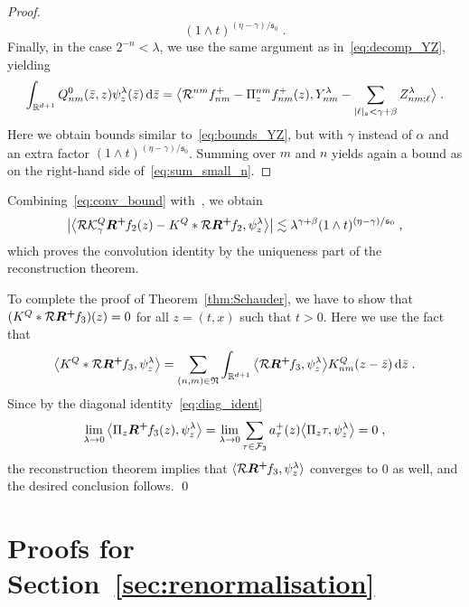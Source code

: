 \documentclass[reqno,11pt]{article}
\def\Rplus{\boldsymbol{R^+}\hspace{-.1em}}
\def\fraks{\mathfrak{s}}
\def\abss#1{\abs{#1}_\mathfrak{s}}
\newcommand{\setnm}{\mathfrak{N}}
\newcommand{\sumnm}{\sum_{(n,m)\in\setnm}}
\begin{document}
\begin{proof}
\begin{equation}
(1\wedge t)^{(\eta-\gamma)/\fraks_0}\;.
\end{equation} 
Finally, in the case $2^{-n} < \lambda$, we use the same argument as
in~\eqref{eq:decomp_YZ}, yielding 
\begin{equation}
 \int_{\R^{d+1}} Q^0_{nm}(\bar z,z) \psi^\lambda_z(\bar z)\6\bar z 
 = \bigpscal{\cR^{nm}f^+_{nm} - \Pi^{nm}_z f^+_{nm}(z)}
 {Y^\lambda_{nm} - \sum_{\abss{\ell} < \gamma+\beta} Z^\lambda_{nm;\ell}}\;.
\end{equation} 
Here we obtain bounds similar to~\eqref{eq:bounds_YZ}, but with $\gamma$
instead of $\alpha$ and an extra factor $(1\wedge t)^{(\eta-\gamma)/\fraks_0}$.
Summing over $m$ and $n$ yields again a bound as on the right-hand side
of~\eqref{eq:sum_small_n}. 
\end{proof}

Combining~\eqref{eq:conv_bound} with~\cite[Lem.~6.7]{Hairer2014}, we obtain
\begin{equation}
  \bigabs{\bigpscal{\cR\cK^Q_\gamma\Rplus f_2(z) - K^Q*\cR \Rplus f_2}
 {\psi^\lambda_z}} \lesssim \lambda^{\gamma+\beta} (1\wedge
t)^{(\eta-\gamma)/\fraks_0}\;,
\end{equation} 
which proves the convolution identity by the uniqueness part of the
reconstruction theorem. 

To complete the proof of Theorem~\ref{thm:Schauder}, we have to show that
$(K^Q*\cR\Rplus f_3)(z) = 0$ for all $z=(t,x)$ such that $t>0$. Here we use
the fact that 
\begin{equation}
 \bigpscal{K^Q*\cR \Rplus f_3}{\psi^\lambda_z}
 = \sumnm \int_{\R^{d+1}} \bigpscal{\cR\Rplus f_3}{\psi^\lambda_z}
 K^Q_{nm}(z-\bar z)\6\bar z\;.
\end{equation} 
Since by the diagonal identity~\eqref{eq:diag_ident}
\begin{equation}
 \lim_{\lambda\to0} \bigpscal{\Pi_z\Rplus f_3(z)}{\psi^\lambda_z} 
 = \lim_{\lambda\to0} \sum_{\tau\in\cF_3} a^+_\tau(z) 
 \bigpscal{\Pi_z \tau}{\psi^\lambda_z} = 0\;,
\end{equation} 
the reconstruction theorem implies that 
$\pscal{\cR \Rplus f_3}{\psi^\lambda_z}$ converges to $0$ as well, and the
desired conclusion follows. 
\qed


\section{Proofs for Section~\ref{sec:renormalisation}}
\label{app:renorm} 
\end{document}
